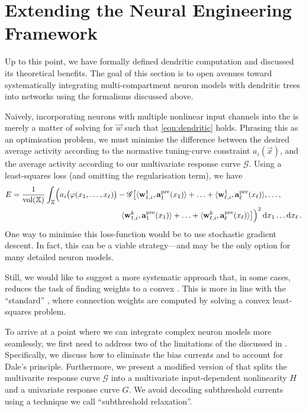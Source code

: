 
\section{Extending the Neural Engineering Framework}
\label{sec:nef_extension}

Up to this point, we have formally defined dendritic computation and discussed its theoretical benefits.
The goal of this section is to open avenues toward systematically integrating multi-compartment neuron models with dendritic trees into \NEF networks using the formalisms discussed above.

Na\"ively, incorporating neurons with multiple nonlinear input channels into the \NEF is merely a matter of solving for $\vec w$ such that \cref{eqn:dendritic} holds.
Phrasing this as an optimisation problem, we must minimise the difference between the desired average activity according to the normative tuning-curve constraint $a_i(\vec x)$, and the average activity according to our multi\-variate response curve $\mathscr{G}$.
Using a least-squares loss (and omitting the regularisation term), we have
\begin{align}
	\begin{aligned}
	E &=
	\frac{1}{\vol(\Xrepr)} \int_{\Xrepr} \Bigl( a_i\bigl(\phi(x_1, \ldots, x_\ell)\bigr) -
	\mathscr{G} \bigl[
		\langle \vec w_{1, i}^1, \vec a^\mathrm{pre}_1(x_1) \rangle + \ldots +
		\langle \vec w_{\ell, i}^1, \vec a^\mathrm{pre}_\ell(x_\ell) \rangle, \ldots,\\
	&~\hspace{13.825em}
		\langle \vec w_{1, i}^k, \vec a^\mathrm{pre}_1(x_1) \rangle + \ldots +
		\langle \vec w_{\ell, i}^k, \vec a^\mathrm{pre}_\ell(x_\ell) \rangle
	\bigr] \Bigr)^2 \, \D x_1 \ldots \D x_\ell \,.
	\end{aligned}
	\label{eqn:dendritic_computation_optimisation}
\end{align}
One way to minimise this loss-function would be to use stochastic gradient descent.
In fact, this can be a viable strategy---and may be the only option for many detailed neuron models.

Still, we would like to suggest a more systematic approach that, in some cases, reduces the task of finding weights to a convex \qprog.
This is more in line with the \enquote{standard} \NEF, where connection weights are computed by solving a convex least-squares problem.

To arrive at a point where we can integrate complex neuron models more seamlessly, we first need to address two of the limitations of the \NEF discussed in .
Specifically, we discuss how to eliminate the bias currents and to account for Dale's principle.
Furthermore, we present a modified version of  that splits the multivarite response curve $\mathscr{G}$ into a multivariate input-dependent nonlinearity $H$ and a univariate response curve $G$.
We avoid decoding subthreshold currents using a technique we call \enquote{subthreshold relaxation}.

